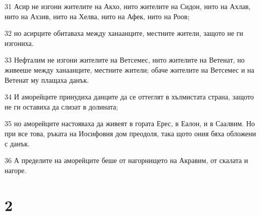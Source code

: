 \par 31 Асир не изгони жителите на Акхо, нито жителите на Сидон, нито на Ахлав, нито на Ахзив, нито на Хелва, нито на Афек, нито на Роов;
\par 32 но асирците обитаваха между ханаанците, местните жители, защото не ги изгониха.
\par 33 Нефталим не изгони жителите на Ветсемес, нито жителите на Ветенат, но живееше между ханаанците, местните жители; обаче жителите на Ветсемес и на Ветенат му плащаха данък.
\par 34 И аморейците принудиха данците да се оттеглят в хълмистата страна, защото не ги оставиха да слизат в долината;
\par 35 но аморейците настояваха да живеят в гората Ерес, в Еалон, и в Саалвим. Но при все това, ръката на Иосифовия дом преодоля, така щото ония бяха обложени с данък.
\par 36 А пределите на аморейците беше от нагорнището на Акравим, от скалата и нагоре.

\chapter{2}

